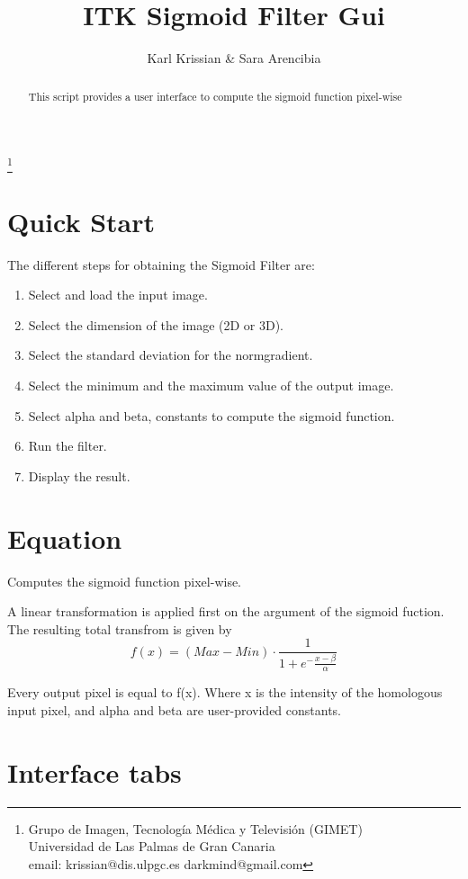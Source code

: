 \documentclass{article}
\begin{document}
\title{ITK Sigmoid Filter Gui}
\author{Karl Krissian \& Sara Arencibia}
\thanks{
Grupo de Imagen, Tecnolog\'ia M\'edica y Televisi\'on (GIMET)\\
Universidad de Las Palmas de Gran Canaria\\
email: krissian@dis.ulpgc.es darkmind@gmail.com
}


\maketitle

\begin{abstract}
This script provides a user interface to compute the sigmoid function pixel-wise 
\end{abstract}


\section{Quick Start}

The different steps for obtaining the Sigmoid Filter are:
\begin{enumerate}
  \item Select and load the input image.
  \item Select the dimension of the image (2D or 3D).
  \item Select the standard deviation for the normgradient.
  \item Select the minimum and the maximum value of the output image.
  \item Select alpha and beta, constants to compute the sigmoid function.
  \item Run the filter.
  \item Display the result.
\end{enumerate}


\section{Equation}
Computes the sigmoid function pixel-wise.

A linear transformation is applied first on the argument of the sigmoid fuction. The resulting total transfrom is given by
\[ f(x) = (Max - Min)\cdot\frac1{1+e^-\frac{x-\beta}{\alpha}} \]

Every output pixel is equal to f(x). Where x is the intensity of the homologous input pixel, and alpha and beta are user-provided constants. 


\section{Interface tabs}
\end{document}
